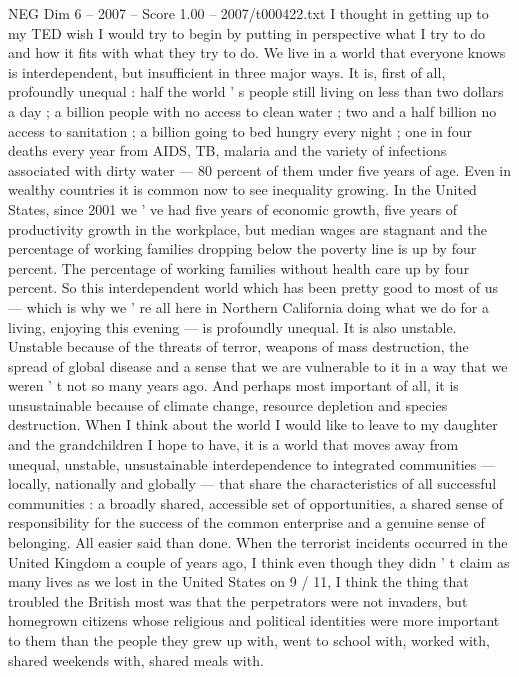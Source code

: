 \begin{textsample}{NEG Dim 6 – 2007 – Score 1.00 – 2007/t000422.txt}  \label{ex:f6_neg_060}
I thought in getting up to my TED wish I would try to begin by putting in perspective what I try to do and how it fits with what they try to do.
We live in a world that everyone knows is interdependent, but insufficient in three major ways.
It is, first of all, profoundly unequal : half the world ' s people still living on less than two dollars a day ; a billion people with no access to clean water ; two and a half billion no access to sanitation ; a billion going to bed hungry every night ; one in four deaths every year from AIDS, TB, malaria and the variety of infections associated with dirty water — 80 percent of them under five years of age.
Even in wealthy countries it is common now to see inequality growing.
In the United States, since 2001 we ' ve had five years of economic growth, five years of productivity growth in the workplace, but median wages are stagnant and the percentage of working families dropping below the poverty line is up by four percent.
The percentage of working families without health care up by four percent.
So this interdependent world which has been pretty good to most of us — which is why we ' re all here in Northern California doing what we do for a living, enjoying this evening — is profoundly unequal.
It is also unstable.
Unstable because of the threats of terror, weapons of mass destruction, the spread of global disease and a sense that we are vulnerable to it in a way that we weren ' t not so many years ago.
And perhaps most important of all, it is unsustainable because of climate change, resource depletion and species destruction.
When I think about the world I would like to leave to my daughter and the grandchildren I hope to have, it is a world that moves away from unequal, unstable, unsustainable interdependence to integrated communities — locally, nationally and globally — that share the characteristics of all successful communities : a broadly shared, accessible set of opportunities, a shared sense of responsibility for the success of the common enterprise and a genuine sense of belonging.
All easier said than done.
When the terrorist incidents occurred in the United Kingdom a couple of years ago, I think even though they didn ' t claim as many lives as we lost in the United States on 9 / 11, I think the thing that troubled the British most was that the perpetrators were not invaders, but homegrown citizens whose religious and political identities were more important to them than the people they grew up with, went to school with, worked with, shared weekends with, shared meals with.

\end{textsample}
